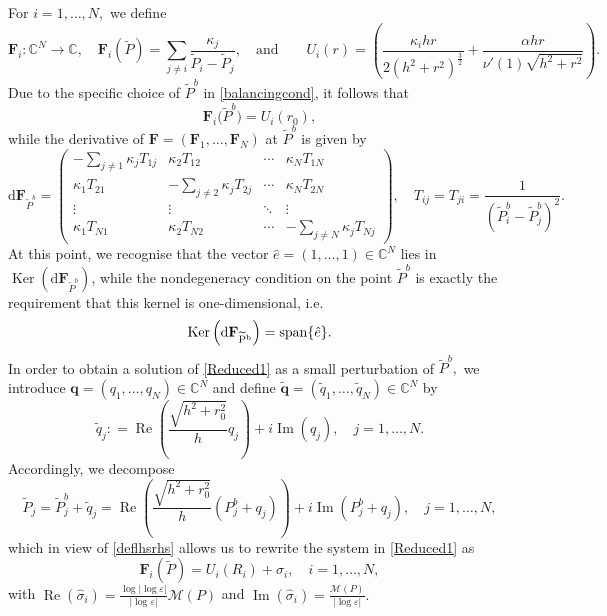 \documentclass[11pt,reqno,a4paper]{amsart}
\numberwithin{equation}{section}
\def\dd{{\mathrm{d}}}
\newcommand{\C}{\mathbb{C}}
\newcommand{\defeq}{\mathrel{\mathop:}=}
\newcommand{\ve}{\varepsilon}
\begin{document}
For $i=1,\dots,N,$ we define
\begin{equation}\label{deflhsrhs}
\mathbf{F}_i:\C^{N}\to \C, \quad \mathbf{F}_i(\widetilde{P})=\sum_{j \neq i}\frac{\kappa_j}{\widetilde{P}_i-\widetilde{P}_j},\quad\mbox{and}\quad \quad U_i(r)=\left(\frac{\kappa_i h r}{2(h^2+r^2)^{\frac 3 2}}+\frac{\alpha h r}{\nu'(1)\sqrt{h^2+r^2}}\right).
\end{equation}
Due to the specific choice of $\widetilde{P}^{b}$ in \eqref{balancingcond}, it follows that
\[\mathbf{F}_i\big(\widetilde{P}^{b}\big)=U_i(r_0),\]
while the derivative of $\mathbf{F}=\left(\mathbf{F}_1,\dots,\mathbf{F}_N\right)$ at $\widetilde{P}^{b}$ is given by
\begin{equation}\label{diffF}
\dd\mathbf{F}_{\widetilde{P}^{b}}=\begin{pmatrix}
-\sum\limits_{j\neq 1}\kappa_j T_{1j} & \kappa_2 T_{12} & \cdots & \kappa_N T_{1N} \\
\kappa_1 T_{21} & -\sum\limits_{j\neq 2}\kappa_j T_{2j} & \cdots & \kappa_N T_{2N} \\
\vdots & \vdots & \ddots & \vdots \\
\kappa_1 T_{N1} & \kappa_2 T_{N2} & \cdots & -\sum\limits_{j\neq N}\kappa_j T_{Nj}
\end{pmatrix},\quad T_{ij}=T_{ji}=\frac{1}{\left(\widetilde{P}_i^{b}-\widetilde{P}_j^{b}\right)^2}.
\end{equation}
At this point, we recognise that the vector $\hat{e}=(1,\dots,1)\in\C^{N}$ lies in $\operatorname{Ker}\left(\dd\mathbf{F}_{\widetilde{P}^{b}}\right)$, while the nondegeneracy condition on the point $\widetilde{P}^{b}$ is exactly the requirement that this kernel is one-dimensional, i.e. 
\[\operatorname{Ker}\left(\rm{d}\mathbf{F}_{\widetilde{P}^{b}}\right)=\mbox{span}\{\hat{e}\}.\]
In order to obtain a solution of \eqref{Reduced1} as a small perturbation of $\widetilde{P}^{b},$ we introduce ${\mathbf{q}}=({q}_1,\dots,{q}_N)\in\C^N$ and define $\tilde{\mathbf{q}}=(\tilde{q}_1,\dots,\tilde{q}_N)\in\C^{N}$ by 
\[\tilde{q}_j\defeq\operatorname{Re}\left(\frac{\sqrt{h^2+r_0^2}}{h}q_j\right)+i\operatorname{Im}(q_j),\quad j=1,\dots,N.\] Accordingly, we decompose
\[\widetilde{P}_j=\widetilde{P}^{b}_j+\tilde{q}_j=\operatorname{Re}\left(\frac{\sqrt{h^2+r_0^2}}{h}(P_j^{b}+q_j)\right)+i\operatorname{Im}\left(P_j^{b}+q_j\right), \quad j=1,\dots,N,\]
which in view of \eqref{deflhsrhs} allows us to rewrite the system in \eqref{Reduced1} as 
\begin{equation}\label{expreduced1}
\mathbf{F}_i(\widetilde{P})=U_i(R_i)+\hat{\sigma}_i, \quad i=1,\dots,N,
\end{equation}
with $\operatorname{Re}(\hat{\sigma}_i)=\frac{\log|\log\ve|}{|\log\ve|}\mathcal{M}(P)$ and $\operatorname{Im}(\hat{\sigma}_i)=\frac{\mathcal{M}(P)}{|\log\ve|}.$
\end{document}

